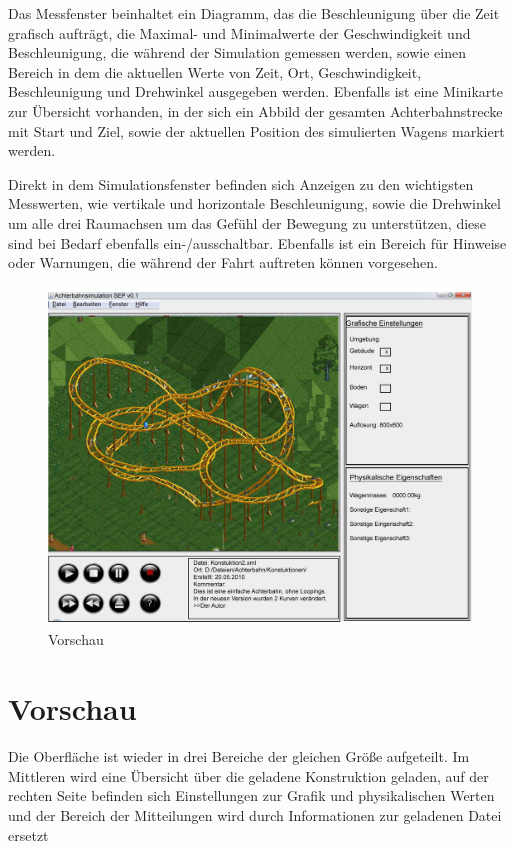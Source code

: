 Das Messfenster beinhaltet ein Diagramm, das die Beschleunigung über die Zeit grafisch aufträgt, die Maximal- und Minimalwerte der Geschwindigkeit und Beschleunigung, die während der Simulation gemessen werden, sowie einen Bereich in dem die aktuellen Werte von Zeit, Ort, Geschwindigkeit, Beschleunigung und Drehwinkel ausgegeben werden.
Ebenfalls ist eine Minikarte zur Übersicht vorhanden, in der sich ein Abbild der gesamten Achterbahnstrecke mit Start und Ziel, sowie der aktuellen Position des simulierten Wagens markiert werden.

Direkt in dem Simulationsfenster befinden sich Anzeigen zu den wichtigsten Messwerten, wie vertikale und horizontale Beschleunigung, sowie die Drehwinkel um alle drei Raumachsen um das Gefühl der Bewegung zu unterstützen, diese sind bei Bedarf ebenfalls ein-/ausschaltbar. Ebenfalls ist ein Bereich für Hinweise oder Warnungen, die während der Fahrt auftreten können vorgesehen. 

\begin{figure}[!h]%
\includegraphics[width=0.8\linewidth]{./bilder/GUI_v3.jpg}%
\caption{Vorschau}%
\label{Vorschau}%
\end{figure}

\section*{Vorschau}
Die Oberfläche ist wieder in drei Bereiche der gleichen Größe aufgeteilt. Im Mittleren wird eine Übersicht über die geladene Konstruktion geladen, auf der rechten Seite befinden sich Einstellungen zur Grafik und physikalischen Werten und der Bereich der Mitteilungen wird durch Informationen zur geladenen Datei ersetzt